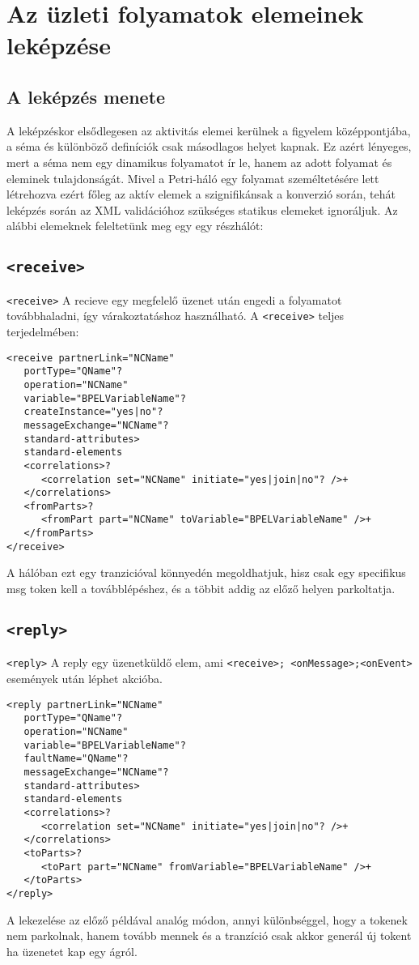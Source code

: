 \documentclass[12pt,a4paper]{book}
\begin{document}
\chapter{Az üzleti folyamatok elemeinek leképzése}


\section{A leképzés menete}
A leképzéskor elsődlegesen az aktivitás elemei kerülnek a figyelem középpontjába, a séma és különböző definíciók csak másodlagos helyet kapnak. Ez azért lényeges, mert a séma nem egy dinamikus folyamatot ír le, hanem az adott folyamat és eleminek tulajdonságát. Mivel a Petri-háló egy folyamat személtetésére lett létrehozva ezért főleg az aktív elemek a szignifikánsak a konverzió során, tehát leképzés során az XML validációhoz szükséges statikus elemeket ignoráljuk.  Az alábbi elemeknek feleltetünk meg egy egy részhálót:
\section{\texttt{<receive>}}
\texttt{<receive>} A recieve egy megfelelő üzenet után engedi a folyamatot továbbhaladni, így várakoztatáshoz használható. A \texttt{<receive>} teljes terjedelmében:\\
\begin{verbatim}
<receive partnerLink="NCName"
   portType="QName"?
   operation="NCName"
   variable="BPELVariableName"?
   createInstance="yes|no"?
   messageExchange="NCName"?
   standard-attributes>
   standard-elements
   <correlations>?
      <correlation set="NCName" initiate="yes|join|no"? />+
   </correlations>
   <fromParts>?
      <fromPart part="NCName" toVariable="BPELVariableName" />+
   </fromParts>
</receive>
\end{verbatim}
A hálóban ezt egy tranzicióval könnyedén megoldhatjuk, hisz csak egy specifikus msg token kell a továbblépéshez, és a többit addig az előző helyen parkoltatja. 

\section{\texttt{<reply>}}
\texttt{<reply>} A reply egy üzenetküldő elem, ami \texttt{<receive>; <onMessage>;<onEvent>} események után léphet akcióba. 
\begin{verbatim}
<reply partnerLink="NCName"
   portType="QName"?
   operation="NCName"
   variable="BPELVariableName"?
   faultName="QName"?
   messageExchange="NCName"?
   standard-attributes>
   standard-elements
   <correlations>?
      <correlation set="NCName" initiate="yes|join|no"? />+
   </correlations>
   <toParts>?
      <toPart part="NCName" fromVariable="BPELVariableName" />+
   </toParts>
</reply>
\end{verbatim}
A lekezelése az előző példával analóg módon, annyi különbséggel, hogy a tokenek nem parkolnak, hanem tovább mennek és a tranzíció csak akkor generál új tokent ha üzenetet kap egy ágról.
\end{document}
